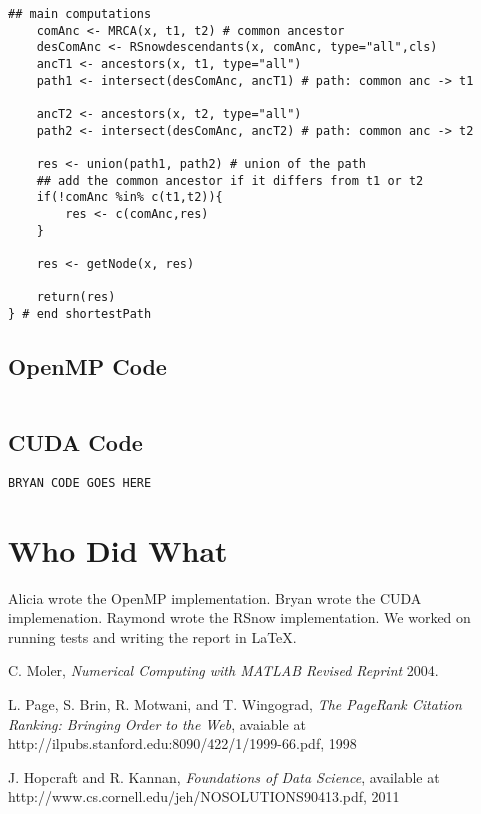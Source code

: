 \documentclass[11pt,letterpaper]{article}
\begin{document}
\begin{lstlisting}[style=MyR]
    ## main computations
    comAnc <- MRCA(x, t1, t2) # common ancestor
    desComAnc <- RSnowdescendants(x, comAnc, type="all",cls)
    ancT1 <- ancestors(x, t1, type="all")
    path1 <- intersect(desComAnc, ancT1) # path: common anc -> t1

    ancT2 <- ancestors(x, t2, type="all")
    path2 <- intersect(desComAnc, ancT2) # path: common anc -> t2

    res <- union(path1, path2) # union of the path
    ## add the common ancestor if it differs from t1 or t2
    if(!comAnc %in% c(t1,t2)){
        res <- c(comAnc,res)
    }

    res <- getNode(x, res)

    return(res)
} # end shortestPath

\end{lstlisting}

\subsection{OpenMP Code}
\begin{lstlisting}[style=MyC++Style]

\end{lstlisting}

\subsection{CUDA Code}
\begin{lstlisting}[style=MyC++Style]
BRYAN CODE GOES HERE
\end{lstlisting}

\section{Who Did What} \label{App:AppendixB}

Alicia wrote the OpenMP implementation. Bryan wrote the CUDA implemenation. Raymond wrote the RSnow implementation. We worked on running tests and writing the report in  \LaTeX.

\newpage

\begin{thebibliography}{1}

   C. Moler, {\em Numerical Computing with MATLAB Revised Reprint}  2004.

    L. Page, S. Brin, R. Motwani, and T. Wingograd, {\em The PageRank Citation Ranking: Bringing Order to the Web}, avaiable at http://ilpubs.stanford.edu:8090/422/1/1999-66.pdf,	1998

    J. Hopcraft and R. Kannan, {\em Foundations of Data Science}, available at http://www.cs.cornell.edu/jeh/NOSOLUTIONS90413.pdf, 2011

\end{thebibliography}
\end{document}
